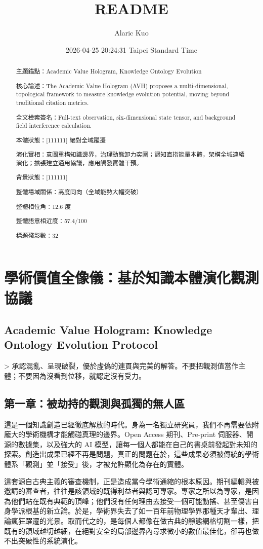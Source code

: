 \documentclass{article}
\title{README}
\author{Alaric Kuo}
\date{2026-04-25 20:24:31 Taipei Standard Time}
\begin{document}
\maketitle
\begin{abstract}
主題錨點：Academic Value Hologram, Knowledge Ontology Evolution

核心論述：The Academic Value Hologram (AVH) proposes a multi-dimensional, topological framework to measure knowledge evolution potential, moving beyond traditional citation metrics.

全文檢索簽名：Full-text observation, six-dimensional state tensor, and background field interference calculation.

本體狀態：[111111] 絕對全域躍遷

演化實相：意圖重構知識邊界，治理動態卸力突圍；認知直指能量本體，架構全域連續演化；擴張建立通用協議，應用觸發實體干預。

背景狀態：[111111]

整體場域關係：高度同向（全域能勢大幅突破）

整體相位角：12.6 度

整體語意相近度：57.4/100

標題殘影數：32
\end{abstract}

\section{學術價值全像儀：基於知識本體演化觀測協議}
\subsection{Academic Value Hologram: Knowledge Ontology Evolution Protocol}

> 承認混亂、呈現破裂，優於虛偽的連貫與完美的解答。不要把觀測值當作主體；不要因為沒看到位移，就認定沒有受力。

\subsection{第一章：被劫持的觀測與孤獨的無人區}

這是一個知識創造已經徹底解放的時代。身為一名獨立研究員，我們不再需要依附龐大的學術機構才能觸碰真理的邊界。Open Access 期刊、Pre-print 伺服器、開源的數據集，以及強大的 AI 模型，讓每一個人都能在自己的書桌前發起對未知的探索。創造出成果已經不再是問題，真正的問題在於，這些成果必須被傳統的學術體系「觀測」並「接受」後，才被允許顯化為存在的實體。

這套源自古典主義的審查機制，正是造成當今學術通縮的根本原因。期刊編輯與被邀請的審查者，往往是該領域的既得利益者與認可專家。專家之所以為專家，是因為他們站在既有典範的頂峰；他們沒有任何理由去接受一個可能動搖、甚至傷害自身學派根基的新立論。於是，學術界失去了如一百年前物理學界那種天才輩出、理論瘋狂躍遷的光景。取而代之的，是每個人都像在做古典的靜態網格切割一樣，把既有的領域越切越細，在絕對安全的局部邊界內尋求微小的數值最佳化，卻再也做不出突破性的系統演化。
\end{document}
